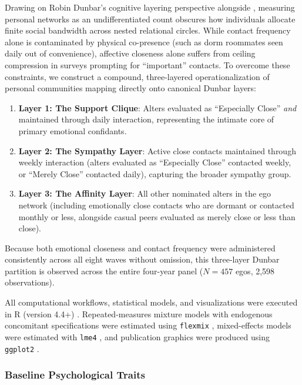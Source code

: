 \documentclass[12pt]{article}
\begin{document}
Drawing on Robin Dunbar's cognitive layering perspective \citep{dunbar1992neocortex, dunbar1998social, dunbar2018anatomy} alongside \citet{marsden1984measuring}, measuring personal networks as an undifferentiated count obscures how individuals allocate finite social bandwidth across nested relational circles. While contact frequency alone is contaminated by physical co-presence (such as dorm roommates seen daily out of convenience), affective closeness alone suffers from ceiling compression in surveys prompting for ``important'' contacts. To overcome these constraints, we construct a compound, three-layered operationalization of personal communities mapping directly onto canonical Dunbar layers:
\begin{enumerate}
  \item \textbf{Layer 1: The Support Clique}: Alters evaluated as ``Especially Close'' \textit{and} maintained through daily interaction, representing the intimate core of primary emotional confidants.
  \item \textbf{Layer 2: The Sympathy Layer}: Active close contacts maintained through weekly interaction (alters evaluated as ``Especially Close'' contacted weekly, or ``Merely Close'' contacted daily), capturing the broader sympathy group.
  \item \textbf{Layer 3: The Affinity Layer}: All other nominated alters in the ego network (including emotionally close contacts who are dormant or contacted monthly or less, alongside casual peers evaluated as merely close or less than close).
\end{enumerate}
Because both emotional closeness and contact frequency were administered consistently across all eight waves without omission, this three-layer Dunbar partition is observed across the entire four-year panel ($N = 457$ egos, 2,598 observations).

All computational workflows, statistical models, and visualizations were executed in \textsf{R} (version 4.4+) \citep{rcoreteam2024}. Repeated-measures mixture models with endogenous concomitant specifications were estimated using \texttt{flexmix} \citep{grun2008flexmix}, mixed-effects models were estimated with \texttt{lme4} \citep{bates2015fitting}, and publication graphics were produced using \texttt{ggplot2} \citep{wickham2016ggplot2}.

\subsubsection{Baseline Psychological Traits}
\end{document}
